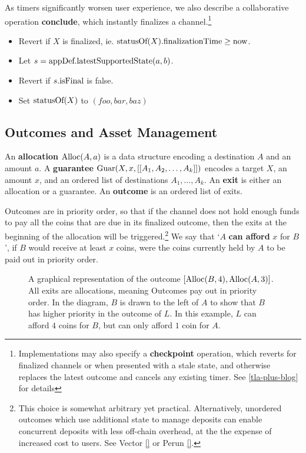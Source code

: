 As timers significantly worsen user experience, we also describe a collaborative operation \textbf{conclude}, which instantly finalizes a channel.\footnote{Implementations may also specify a \textbf{checkpoint} operation, which reverts for finalized channels or when presented with a stale state, and otherwise replaces the latest outcome and cancels any existing timer. See \ref{tla-plus-blog} for details}
\begin{itemize}
  \item Revert if $X$ is finalized, ie. $\mbox{statusOf}(X).\mbox{finalizationTime} \ge \mbox{now}$.
  \item Let $s = \mbox{appDef}.\mbox{latestSupportedState}(a, b)$. 
  \item Revert if $s.\mbox{isFinal}$ is false.
  \item Set $\mbox{statusOf}(X)$ to $(foo, bar, baz)$
\end{itemize}

\subsection{Outcomes and Asset Management}\label{sec:outcomes}

An \textbf{allocation} $\mbox{Alloc}(A, a)$ is a data structure encoding a destination $A$ and an amount $a$.
A \textbf{guarantee} $\mbox{Guar}(X, x, [[A_1, A_2, \ldots, A_k]])$ encodes a target $X$, an amount $x$, and an ordered list of destinations $A_1, \ldots, A_k$.
An \textbf{exit} is either an allocation or a guarantee.
An \textbf{outcome} is an ordered list of exits.

Outcomes are in priority order, so that if the channel does not hold enough funds to pay all the coins that are due in its finalized outcome, then the exits at the beginning of the allocation will be triggered.\footnote{This choice is somewhat arbitrary yet practical. Alternatively, unordered outcomes which use additional state to manage deposits can enable concurrent deposits with less off-chain overhead, at the the expense of increased cost to users. See Vector \ref{} or Perun \ref{}.}
We say that `$A$ \textbf{can afford} $x$ for $B$', if $B$ would receive at least $x$ coins, were the coins currently held by $A$ to be paid out in priority order.

\begin{figure}[h]\centering
  \makebox[\textwidth][c]{}
  \caption{
    A graphical representation of the outcome $[\mbox{Alloc}(B, 4), \mbox{Alloc}(A, 3)]$.
    All exits are allocations, meaning
    Outcomes pay out in priority order.
    In the diagram, $B$ is drawn to the left of $A$ to show that $B$ has higher priority in the outcome of $L$.
    In this example, $L$ can afford $4$ coins for $B$, but can only afford $1$ coin for $A$.
  }\label{fig:transfer-insufficient-funds}
\end{figure}

